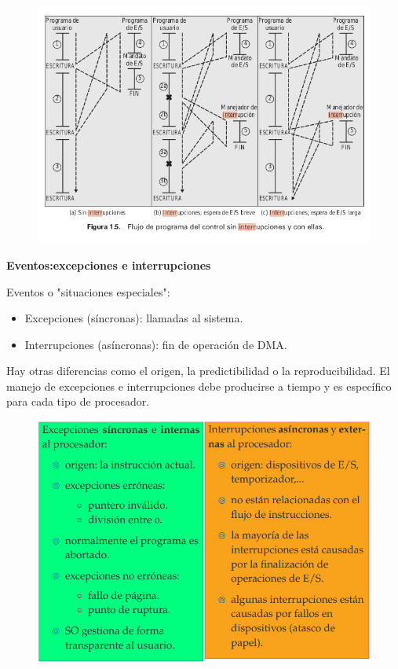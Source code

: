 \documentclass{article}
\begin{document}
\begin{figure}[h]
\centering
\includegraphics[scale=1,width=\textwidth]{interrupciones.png}
\end{figure}

\textbf{Eventos:excepciones e interrupciones}

Eventos o "situaciones especiales":
\begin{itemize}
\item Excepciones (síncronas): llamadas al sistema.

\item Interrupciones (asíncronas): fin de operación de DMA.
\end{itemize}

Hay otras diferencias como el origen, la predictibilidad o la reproducibilidad. El manejo de excepciones e interrupciones debe producirse a tiempo y es específico para cada tipo de procesador.

\begin{figure}[h]
\centering
\includegraphics[scale=1,width=\textwidth]{eventos.png}
\end{figure}
\end{document}
